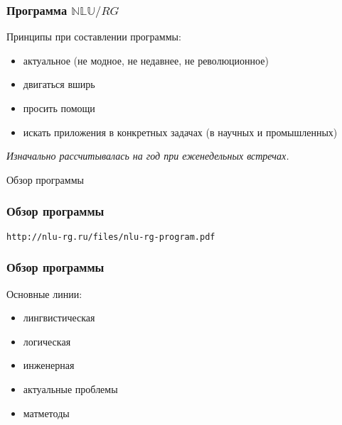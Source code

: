 \documentclass{beamer}
\begin{document}
\begin{frame}[fragile]
\frametitle{Программа $\mathbb{NLU}/RG$}
Принципы при составлении программы:\bigskip 
\begin{itemize}
  \item актуальное (не модное, не недавнее, не революционное)
  \item двигаться вширь
  \item просить помощи
  \item искать приложения в конкретных задачах (в научных и промышленных)
\end{itemize}
\bigskip  
\textit{Изначально рассчитывалась на год при еженедельных встречах.}
\end{frame}

\begin{frame}{}
\thispagestyle{empty}
\begin{center}
{\large Обзор программы}
\end{center}
\end{frame}

\begin{frame}[fragile]
\frametitle{Обзор программы}
\begin{center}
\texttt{http://nlu-rg.ru/files/nlu-rg-program.pdf}
\end{center}
\end{frame}

\begin{frame}[fragile]
\frametitle{Обзор программы}
Основные линии:\bigskip
\begin{itemize}
  \item лингвистическая
  \item логическая
  \item инженерная
  \item актуальные проблемы
  \item матметоды
\end{itemize}
\end{frame}
\end{document}
